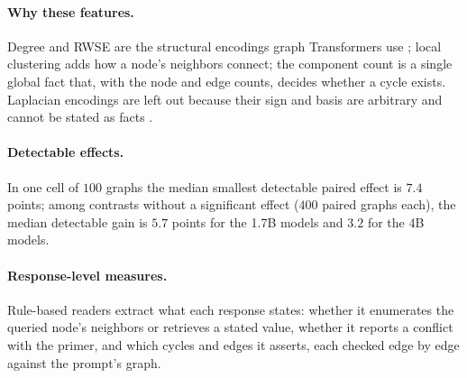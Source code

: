 
\paragraph{Why these features.} Degree and RWSE are the structural encodings graph Transformers use \citep{rampasek2022recipe}; local clustering adds how a node's neighbors connect; the component count is a single global fact that, with the node and edge counts, decides whether a cycle exists. Laplacian encodings are left out because their sign and basis are arbitrary and cannot be stated as facts \citep{dwivedi2022graph}.

\paragraph{Detectable effects.} In one cell of $100$ graphs the median smallest detectable paired effect is $7.4$ points; %
among contrasts without a significant effect ($400$ paired graphs each), the median detectable gain is $5.7$ points for the 1.7B models and $3.2$ for the 4B models. %

\paragraph{Response-level measures.} Rule-based readers extract what each response states: whether it enumerates the queried node's neighbors or retrieves a stated value, whether it reports a conflict with the primer, and which cycles and edges it asserts, each checked edge by edge against the prompt's graph.

